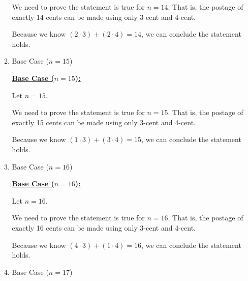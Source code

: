 \documentclass[12pt]{article}
\begin{document}
\begin{itemize}
\begin{mdframed}
\begin{enumerate}[1.]
\begin{mdframed}
            \bigskip

            We need to prove the statement is true for $n = 14$. That is, the
            postage of exactly 14 cents can be made using only 3-cent and 4-cent.

            \bigskip

            Because we know $(2 \cdot 3) + (2 \cdot 4)=14$, we can conclude the statement holds.

            \end{mdframed}

            \item Base Case ($n = 15$)

            \begin{mdframed}
            \underline{\textbf{Base Case ($n = 15$):}}

            \bigskip

            Let $n = 15$.

            \bigskip

            We need to prove the statement is true for $n = 15$. That is, the
            postage of exactly 15 cents can be made using only 3-cent and 4-cent.

            \bigskip

            Because we know $(1 \cdot 3) + (3 \cdot 4)=15$, we can conclude the statement holds.

            \end{mdframed}

            \item Base Case ($n = 16$)

            \begin{mdframed}
            \underline{\textbf{Base Case ($n = 16$):}}

            \bigskip

            Let $n = 16$.

            \bigskip

            We need to prove the statement is true for $n = 16$. That is, the
            postage of exactly 16 cents can be made using only 3-cent and 4-cent.

            \bigskip

            Because we know $(4 \cdot 3) + (1 \cdot 4)=16$, we can conclude the statement holds.

            \end{mdframed}

            \item Base Case ($n = 17$)


\end{enumerate}
\end{mdframed}
\end{itemize}
\end{document}
